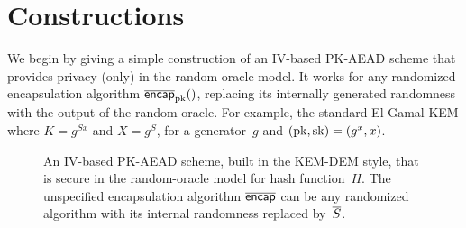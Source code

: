 \section{Constructions}
\label{sec:constructions}
We begin by giving a simple construction of an IV-based PK-AEAD scheme that provides privacy (only) in the random-oracle model. It works for any randomized encapsulation algorithm $\OLencapprim{\pk}{}$, replacing its internally generated randomness with the output of the random oracle.  For example, the standard El Gamal KEM where $K=g^{\overline{S}x}$ and $X=g^{\overline{S}}$, for a generator~$g$ and $(\mathrm{pk},\mathrm{sk})=(g^x,x)$.


\begin{figure}
\begin{center}

\medskip
\hspace*{.5ex} 
\caption{An IV-based PK-AEAD scheme, built in the KEM-DEM style, that is secure in the random-oracle model for hash function~$H$. The unspecified encapsulation algorithm $\overline{\mathsf{encap}}$ can be any randomized algorithm with its internal randomness replaced by~$\overline{S}$.
}
\label{fig:ro-kem-dem-construction}
\end{center}
\end{figure}



